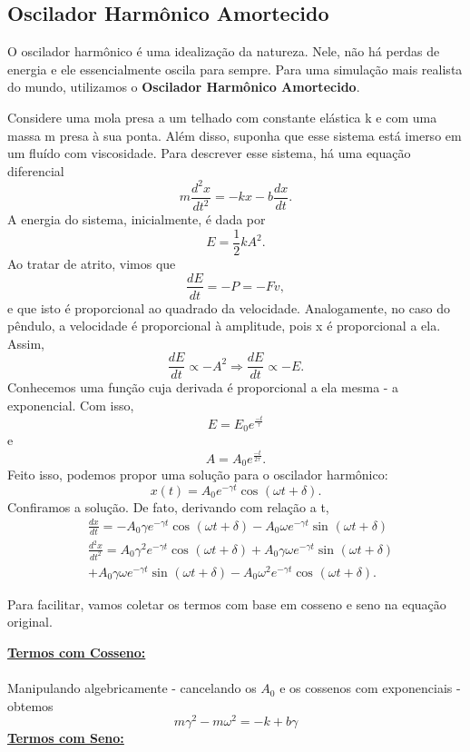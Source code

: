 \documentclass[PhysicsII/physicsII_notes.tex]{subfiles}
\begin{document}
\subsection{Oscilador Harmônico Amortecido}
O oscilador harmônico é uma idealização da natureza. Nele, não há perdas de energia e ele essencialmente
oscila para sempre. Para uma simulação mais realista do mundo, utilizamos o \textbf{Oscilador Harmônico Amortecido}.

Considere uma mola presa a um telhado com constante elástica k e com uma massa m presa à sua ponta. Além disso, suponha que
esse sistema está imerso em um fluído com viscosidade. Para descrever esse sistema, há uma equação diferencial
\[
	m \frac{d^{2}x}{dt^{2}} = -kx - b \frac{dx}{dt}.
\]
A energia do sistema, inicialmente, é dada por
\[
	E = \frac{1}{2}kA^{2}.
\]
Ao tratar de atrito, vimos que
\[
	\frac{dE}{dt} = - P = - Fv,
\]
e que isto é proporcional ao quadrado da velocidade. Analogamente, no caso do pêndulo, a velocidade é proporcional à amplitude, pois x
é proporcional a ela. Assim,
\[
	\frac{dE}{dt}\propto -A^{2} \Rightarrow \frac{dE}{dt}\propto -E.
\]
Conhecemos uma função cuja derivada é proporcional a ela mesma - a exponencial. Com isso,
\[
	E = E_{0} e^{\frac{-t}{\tau }}
\]
e
\[
	A = A_{0} e^{\frac{-t}{2\tau }}.
\]
Feito isso, podemos propor uma solução para o oscilador harmônico:
\[
	x(t) = A_{0}e^{-\gamma t}\cos^{}{(\omega t + \delta )}.
\]
Confiramos a solução. De fato, derivando com relação a t,
\begin{align*}
	 & \frac{dx}{dt} = -A_{0}\gamma e^{-\gamma t}\cos^{}{(\omega t + \delta )}-A_{0}\omega e^{-\gamma t}\sin^{}{(\omega t + \delta )}                     \\
	 & \frac{d^{2}x}{dt^{2}} = A_{0}\gamma ^{2}e^{-\gamma t}\cos^{}{(\omega t + \delta )} + A_{0}\gamma \omega e^{-\gamma t}\sin^{}{(\omega t + \delta )} \\
	 & +A_{0}\gamma\omega e^{-\gamma t}\sin^{}{(\omega t+\delta )}-A_{0}\omega ^{2}e^{-\gamma t}\cos^{}{(\omega t + \delta )}.
\end{align*}

Para facilitar, vamos coletar os termos com base em cosseno e seno na equação original.

\textbf{\underline{Termos com Cosseno:}}
\paragraph{}  Manipulando algebricamente - cancelando os \(A_{0}\) e os cossenos com exponenciais - obtemos
\[
	m\gamma ^{2} - m\omega^{2} = -k + b\gamma
\]
\newpage
\textbf{\underline{Termos com Seno:}}
\end{document}
